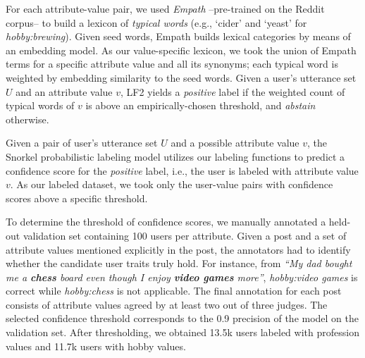 \begin{table}[t!]
\caption{Positive and negative patterns used in the labeling function LF1 of the Snorkel labeling model. Each pattern must be followed by possible attribute values within a context window of 2 terms.}
\label{tab:patterns}
\end{table}


 For each attribute-value pair, we used \textit{Empath} \cite{fast2016empath} --pre-trained on the Reddit corpus-- to build a lexicon of \emph{typical words} (e.g., `cider' and `yeast' for \emph{hobby:brewing}). Given seed words, Empath builds lexical categories by means of an embedding model. As our value-specific lexicon, we took the union of Empath terms for a specific attribute value and all its synonyms; each typical word is weighted by embedding similarity to the seed words. 
Given a user's utterance set $U$ and an attribute value $v$, LF2 yields a \emph{positive} label if the weighted count of typical words of $v$ is above an empirically-chosen threshold, and \emph{abstain} otherwise.

\vspace{5pt}
Given a pair of user's utterance set $U$ and a possible attribute value $v$, the Snorkel probabilistic labeling model utilizes our labeling functions to
predict a confidence score for the \emph{positive} label, i.e., the user is labeled with attribute value $v$.
As our labeled dataset, we took only the user-value pairs with confidence scores above a specific threshold. 

To determine the threshold of confidence scores, we manually annotated a held-out validation set containing 100 users per attribute. 
Given a post and a set of attribute values mentioned explicitly in the post, the annotators had to identify whether the candidate user traits truly hold. For instance, from \emph{``My dad bought me a \textbf{chess} board even though I enjoy \textbf{video games} more''}, \emph{hobby:video games} is correct while \emph{hobby:chess} is not applicable.
The final annotation for each post consists of attribute values agreed by at least two out of three judges. The selected confidence threshold corresponds to the 0.9 precision of the model on the validation set. After thresholding, we obtained 13.5k users labeled with profession values and 11.7k users with hobby values.

